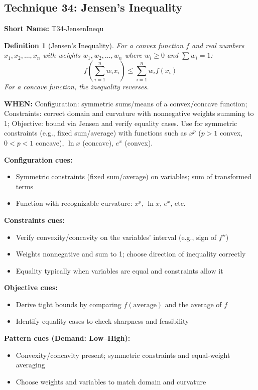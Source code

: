 \documentclass[12pt]{article}
\newtheorem{definition}{Definition}[section]
\begin{document}
\subsection{Technique 34: Jensen's Inequality}
\textbf{Short Name:} T34-JensenInequ

\begin{definition}[Jensen's Inequality]
For a convex function $f$ and real numbers \\
$x_1, x_2, \ldots, x_n$ with weights $w_1, w_2, \ldots, w_n$ where $w_i \geq 0$ and $\sum w_i = 1$:
$$f\left(\sum_{i=1}^n w_i x_i\right) \leq \sum_{i=1}^n w_i f(x_i)$$
For a concave function, the inequality reverses.
\end{definition}

\textbf{WHEN:} Configuration: symmetric sums/means of a convex/concave function; Constraints: correct domain and curvature with nonnegative weights summing to 1; Objective: bound via Jensen and verify equality cases. Use for symmetric constraints (e.g., fixed sum/average) with functions such as $x^p$ ($p>1$ convex, $0<p<1$ concave), $\ln x$ (concave), $e^x$ (convex).

\textbf{Configuration cues:}
\begin{itemize}
    \item Symmetric constraints (fixed sum/average) on variables; sum of transformed terms
    \item Function with recognizable curvature: $x^p$, $\ln x$, $e^x$, etc.
\end{itemize}

\textbf{Constraints cues:}
\begin{itemize}
    \item Verify convexity/concavity on the variables' interval (e.g., sign of $f''$)
    \item Weights nonnegative and sum to 1; choose direction of inequality correctly
    \item Equality typically when variables are equal and constraints allow it
\end{itemize}

\textbf{Objective cues:}
\begin{itemize}
    \item Derive tight bounds by comparing $f(\text{average})$ and the average of $f$
    \item Identify equality cases to check sharpness and feasibility
\end{itemize}

\textbf{Pattern cues (Demand: Low–High):}
\begin{itemize}
    \item Convexity/concavity present; symmetric constraints and equal-weight averaging
    \item Choose weights and variables to match domain and curvature
\end{itemize}
\end{document}
